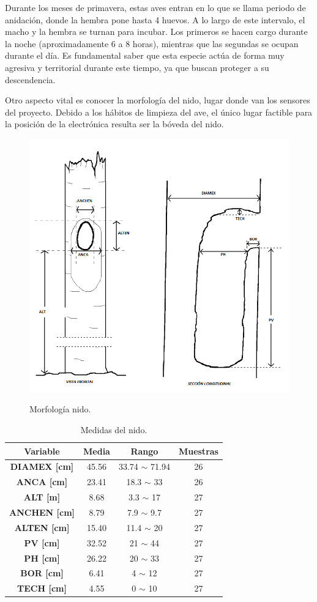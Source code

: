 Durante los meses de primavera, estas aves entran en lo que se llama periodo de anidación, donde la hembra pone hasta 4 huevos. A lo largo de este intervalo, el macho y la hembra se turnan para incubar. Los primeros se hacen cargo durante la noche (aproximadamente 6 a 8 horas), mientras que las segundas se ocupan durante el día. Es fundamental saber que esta especie actúa de forma muy agresiva y territorial durante este tiempo, ya que buscan proteger a su descendencia.

Otro aspecto vital es conocer la morfología del nido, lugar donde van los sensores del proyecto. Debido a los hábitos de limpieza del ave, el único lugar factible para la posición de la electrónica resulta ser la bóveda del nido.
\begin{figure}[H]
	\centering
	\includegraphics[width=0.5\linewidth]{ImagenesIntroduccion/morfologia_nido}
	\label{fig:morfología_nido}
	\caption{Morfología nido.}
\end{figure}

\begin{table}[H]
\centering
\begin{tabular}{|c|c|c|c|}
\hline
\textbf{Variable}    & \textbf{Media} & \textbf{Rango}     & \textbf{Muestras} \\ \hline
\textbf{DIAMEX [cm]} & 45.56          & 33.74 $\sim$ 71.94 & 26                \\ \hline
\textbf{ANCA [cm]}   & 23.41          & 18.3 $\sim$ 33     & 26                \\ \hline
\textbf{ALT [m]}     & 8.68           & 3.3 $\sim$ 17      & 27                \\ \hline
\textbf{ANCHEN [cm]} & 8.79           & 7.9 $\sim$ 9.7     & 27                \\ \hline
\textbf{ALTEN [cm]}  & 15.40          & 11.4 $\sim$ 20     & 27                \\ \hline
\textbf{PV [cm]}     & 32.52          & 21 $\sim$ 44       & 27                \\ \hline
\textbf{PH [cm]}     & 26.22          & 20 $\sim$ 33       & 27                \\ \hline
\textbf{BOR [cm]}    & 6.41           & 4 $\sim$ 12        & 27                \\ \hline
\textbf{TECH [cm]}   & 4.55           & 0 $\sim$ 10        & 27                \\ \hline
\end{tabular}
\caption{Medidas del nido.}
\end{table}


